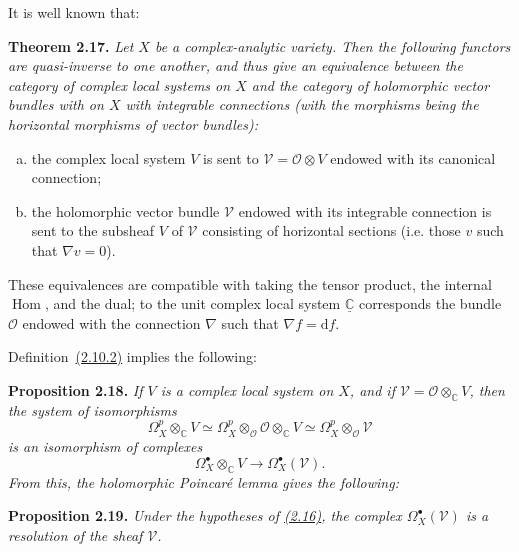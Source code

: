 \documentclass{report}
\newenvironment{itenv}[1]
  {\phantomsection\par\medskip\noindent\textbf{#1.}\itshape}
  {\medskip}
\renewcommand{\cal}[1]{{\mathcal{#1}}}
\newcommand{\CC}{\mathbb{C}}
\newcommand{\dd}{\mathrm{d}}
\DeclareMathOperator{\Hom}{Hom}
\newcommand{\oldpage}[1]{\marginpar{\footnotesize$\Big\vert$ \textit{p.~#1}}}
\begin{document}
It is well known that:
\begin{itenv}{Theorem 2.17}
\label{I.2.17}
  Let $X$ be a complex-analytic variety.
  Then the following functors are quasi-inverse to one another, and thus give an equivalence between the category of complex local systems on $X$ and the category of holomorphic vector bundles with on $X$ with integrable connections (with the morphisms being the horizontal morphisms of vector bundles):
  \begin{enumerate}[a)]
    \item the complex local system $V$ is sent to $\cal{V}=\cal{O}\otimes V$ endowed with its canonical connection;
    \item the holomorphic vector bundle $\cal{V}$ endowed with its integrable connection is sent to the subsheaf $V$ of $\cal{V}$ consisting of horizontal sections (i.e. those $v$ such that $\nabla v=0$).
  \end{enumerate}
\end{itenv}

These equivalences are compatible with taking the tensor product, the internal $\Hom$, and the dual;
to the unit complex local system $\underline{\CC}$ corresponds the bundle $\cal{O}$ endowed with the connection $\nabla$ such that $\nabla f=\dd f$.

Definition~\hyperref[I.2.10.2]{(2.10.2)} implies the following:
\begin{itenv}{Proposition 2.18}
\label{I.2.18}
  If $V$ is a complex local system on $X$, and if $\cal{V}=\cal{O}\otimes_\CC V$,
\oldpage{13}
  then the system of isomorphisms
  \[
    \Omega_X^p\otimes_\CC V
    \simeq
    \Omega_X^p\otimes_\cal{O}\cal{O}\otimes_\CC V
    \simeq
    \Omega_X^p\otimes_\cal{O}\cal{V}
  \]
  is an isomorphism of complexes
  \[
    \Omega_X^\bullet\otimes_\CC V \to \Omega_X^\bullet(\cal{V}).
  \]
\end{itenv}
From this, the holomorphic Poincar\'{e} lemma gives the following:
\begin{itenv}{Proposition 2.19}
\label{I.2.19}
  Under the hypotheses of \hyperref[I.2.16]{(2.16)}, the complex $\Omega_X^\bullet(\cal{V})$ is a resolution of the sheaf $\cal{V}$.
\end{itenv}
\end{document}

